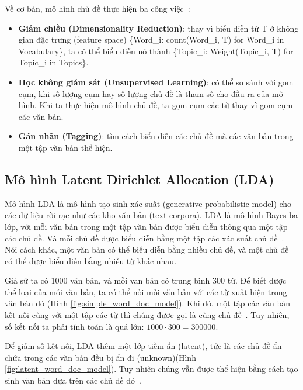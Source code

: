 Về cơ bản, mô hình chủ đề thực hiện ba công việc~\cite{kapadiaTopicModelingPython2020}:

\begin{itemize}
	\item \textbf{Giảm chiều (Dimensionality Reduction)}: thay vì biểu diễn từ T ở không gian đặc trưng (feature space) \{Word\_i: count(Word\_i, T) for Word\_i in Vocabulary\}, ta có thể biểu diễn nó thành \{Topic\_i: Weight(Topic\_i, T) for Topic\_i in Topics\}.
	
	\item \textbf{Học không giám sát (Unsupervised Learning)}: có thể so sánh với gom cụm, khi số lượng cụm hay số lượng chủ đề là tham số cho đầu ra của mô hình. Khi ta thực hiện mô hình chủ đề, ta gọm cụm các từ thay vì gom cụm các văn bản.
	
	\item \textbf{Gán nhãn (Tagging)}: tìm cách biểu diễn các chủ đề mà các văn bản trong một tập văn bản thể hiện.
\end{itemize}

\subsection{Mô hình Latent Dirichlet Allocation (LDA)}
\label{sec:lda}

Mô hình LDA là mô hình tạo sinh xác suất (generative probabilistic model) cho các dữ liệu rời rạc như các kho văn bản (text corpora). LDA là mô hình Bayes ba lớp, với mỗi văn bản trong một tập văn bản được biểu diễn thông qua một tập các chủ đề. Và mỗi chủ đề được biểu diễn bằng một tập các xác suất chủ đề~\cite{bleiLatentDirichletAllocation2003}. Nói cách khác, một văn bản có thể biểu diễn bằng nhiều chủ đề, và một chủ đề có thể được biểu diễn bằng nhiều từ khác nhau.

Giả sử ta có 1000 văn bản, và mỗi văn bản có trung bình 300 từ. Để biết được thể loại của mỗi văn bản, ta có thể nối mỗi văn bản với các từ xuất hiện trong văn bản đó (Hình \ref{fig:simple_word_doc_model}). Khi đó, một tập các văn bản kết nối cùng với một tập các từ thì chúng được gọi là cùng chủ đề~\cite{ganegedaraIntuitiveGuideLatent2021}. Tuy nhiên, số kết nối ta phải tính toán là quá lớn: $1000 \cdot 300 = 300000$.


Để giảm số kết nối, LDA thêm một lớp tiềm ẩn (latent), tức là các chủ đề ẩn chứa trong các văn bản đều bị ẩn đi (unknown)(Hình \ref{fig:latent_word_doc_model}).  Tuy nhiên chúng vẫn được thể hiện bằng cách tạo sinh văn bản dựa trên các chủ đề đó~\cite{tomarTopicModelingUsing2019}.

